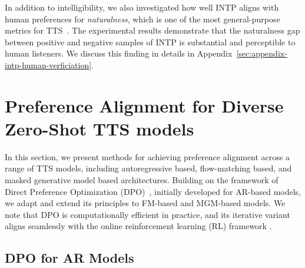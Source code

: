\documentclass[11pt]{article}
\begin{document}
In addition to intelligibility, we also investigated how well INTP aligns with human preferences for \textit{naturalness}, which is one of the most general-purpose metrics for TTS~\cite{tts-book-tanxu}. The experimental results demonstrate that the naturalness gap between positive and negative samples of INTP is substantial and perceptible to human listeners. We discuss this finding in details in Appendix~\ref{sec:appendix-intp-human-verficiation}.


\section{Preference Alignment for Diverse Zero-Shot TTS models}\label{method:dpo}

In this section, we present methods for achieving preference alignment across a range of TTS models, including autoregressive based, flow-matching based, and masked generative model based architectures. Building on the framework of Direct Preference Optimization (DPO)~\cite{dpo}, initially developed for AR-based models, we adapt and extend its principles to FM-based and MGM-based models. We note that DPO is computationally efficient in practice, and its iterative variant aligns seamlessly with the online reinforcement learning (RL) framework \citep{li2023rema4}.



\subsection{DPO for AR Models}
\label{method:dpo_ar}
\end{document}
